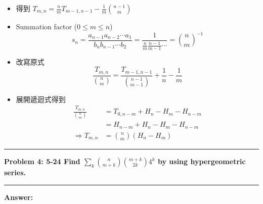 \documentclass[11pt]{article}
\newcommand\question[2]{\vspace{.25in}\hrule\textbf{#1: #2}\vspace{.5em}\hrule\vspace{.10in}}
\renewcommand\part[1]{\vspace{.10in}\textbf{#1}}
\begin{document}
\begin{itemize}
	\item 
		得到 $T_{m,n} = \frac{n}{m} T_{m-1,n-1} - \frac{1}{m} \binom{n-1}{m}$
	\item
		Summation factor ($0 \le m \le n$)
	$$s_n = \frac{a_{n-1} a_{n-2} \cdots a_1}{b_n b_{n-1} \cdots b_2} = \frac{1}{\frac{n}{m} \frac{n-1}{m-1} \cdots} =\binom{n}{m}^{-1}$$
	\item
		改寫原式
		$$\frac{T_{m,n}}{\binom{n}{m}} = \frac{T_{m-1,n-1}}{\binom{n-1}{m-1}} + \frac{1}{n} - \frac{1}{m}$$
	\item 
		展開遞迴式得到
		\begin{align*}
			\frac{T_{m,n}}{\binom{n}{m}} &= T_{0,n-m} + H_n - H_m - H_{n-m}	\\
			&= H_{n-m} + H_n - H_m - H_{n-m} \\
		\Rightarrow T_{m,n} &= \binom{n}{m} (H_n - H_m)
		\end{align*}
\end{itemize}

\question{Problem 4} {5-24 Find $\sum_k \binom{n}{m+k} \binom{m+k}{2k} 4^k$ by using hypergeometric series.}

\part{Answer:}
\end{document}
